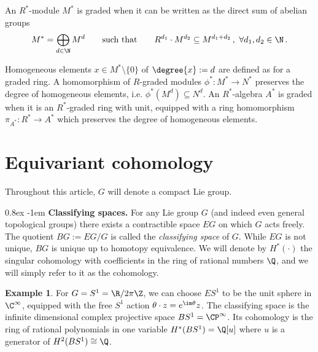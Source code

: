 \documentclass[11pt,a4paper,reqno]{article}
\makeatletter
\renewcommand{\paragraph}{%
  \@startsection{paragraph}{4}{\z@}%
  {0.8ex}  %
  {-1em}   %
  {\normalfont\bfseries}%
}
\numberwithin{equation}{section}
\theoremstyle{definition}
\newtheorem{example}[theorem]{Example}
\makeatother
\begin{document}
An $R^*$-module $M^*$ is graded when it can be written as the direct sum of abelian groups
\begin{align*}
M^*=\bigoplus_{d\in\N} M^d \qquad
\text{such that}
\qquad R^{d_1}\cdot M^{d_2}\subseteq M^{d_1+d_2} \, , 
\  \forall 
d_1,d_2\in\N \, . 
\end{align*}

Homogeneous elements 
$x\in M^*\setminus\{0\}$ of $\degree{x}:=d$
are defined as for a graded ring. A homomorphism of $R$-graded modules $\phi^*:M^*\to N^*$ 
  preserves the degree of homogeneous elements, i.e. $\phi^*(M^d)\subseteq N^d$.
An $R^*$-algebra $A^*$ is graded when it is an $R^*$-graded ring with unit, equipped with a ring homomorphism $\pi_{A^*}:R^*\to A^*$ which preserves the degree of homogeneous elements. 



\section{Equivariant cohomology}
\label{s:equivariant_cohomology}

Throughout this article, $G$ will denote a compact Lie group.

\paragraph{\bf Classifying spaces.}
 For any Lie group $ G $ (and indeed even general topological groups) there exists a contractible space $EG$ on which $ G $ acts freely. 
The quotient $BG:=EG/G$ is called the \emph{classifying space} of $G$. While $EG$ is not unique, $BG$ is unique up to homotopy equivalence. We will denote by $H^*(\cdot)$ the singular cohomology with coefficients in the ring of rational numbers $\Q$, and we will simply refer to it as the cohomology. 

    
\begin{example}
For $G=S^1=\R/2\pi\Z$, we can choose $ES^1$ to be the unit sphere in $\C^\infty$, equipped with the free $S^1$ action $\theta \cdot z= e^{ \im \theta}z$. The classifying space  is the infinite dimensional complex projective space $BS^1=\CP^\infty$. Its cohomology is the ring of rational polynomials in one variable
$ H^*(BS^1)=\Q[u] $ 
where $u$ is a generator of $H^2(BS^1)\cong\Q$.
\end{example}
\end{document}
